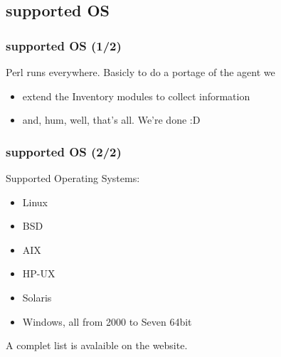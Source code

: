 \subsection{supported OS}
\begin{frame}
\frametitle{supported OS (1/2)}
Perl runs everywhere.
\pause
Basicly to do a portage of the agent we
\begin{itemize}
%
\item extend the Inventory modules to collect information
\item and, hum, well, that's all. We're done :D
%
\end{itemize}

\end{frame}
\begin{frame}
\frametitle{supported OS (2/2)}
Supported Operating Systems:
\begin{itemize}
%
\item Linux
\pause
\item BSD
\pause
\item AIX
\pause
\item HP-UX
\pause
\item Solaris
\pause
\item Windows, all from 2000 to Seven 64bit
%
\end{itemize}
A complet list is avalaible on the website.
\end{frame}
 
